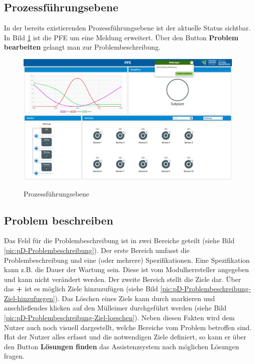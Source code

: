 \subsection{Prozessführungsebene}
In der bereits existierenden Prozessführungsebene ist der aktuelle Status sichtbar. In Bild \ref{pic:pD-PFE} ist die PFE um eine Meldung erweitert. Über den Button \textbf{Problem bearbeiten} gelangt man zur Problembeschreibung.
\begin{figure}[htbp]
\centering
\includegraphics[angle=90, scale=0.47]{DA_files/Bilder/Konzept/Skizze-PFE.png}
\label{pic:pD-PFE}
\caption{Prozessführungsebene}
\end{figure}

\subsection{Problem beschreiben}
Das Feld für die Problembeschreibung ist in zwei Bereiche geteilt (siehe Bild \ref{pic:pD-Problembeschreibung}). Der erste Bereich umfasst die Problembeschreibung und eine (oder mehrere) Spezifikationen. Eine Spezifikation kann z.B. die Dauer der Wartung sein. Diese ist vom Modulherrsteller angegeben und kann nicht verändert werden. Der zweite Bereich stellt die Ziele dar. Über das \textbf{+} ist es möglich Ziele hinzuzufügen (siehe Bild \ref{pic:pD-Problembeschreibung-Ziel-hinzufuegen}). Das Löschen eines Ziels kann durch markieren und anschließendes klicken auf den Mülleimer durchgeführt werden (siehe Bild \ref{pic:pD-Problembeschreibung-Ziel-loeschen}). Neben diesen Fakten wird dem Nutzer auch noch visuell dargestellt, welche Bereiche vom Problem betroffen sind.
Hat der Nutzer alles erfasst und die notwendigen Ziele definiert, so kann er über den Button \textbf{Lösungen finden} das Assistenzsystem nach möglichen Lösungen fragen.

